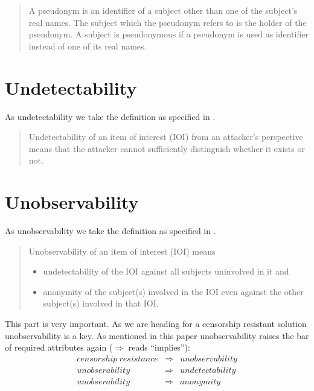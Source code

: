 \begin{quote}
	A pseudonym is an identifier of a subject other than one of the subject's real
	names. The subject which the pseudonym refers to is the holder of the pseudonym. A subject is pseudonymous if a pseudonym is used as identifier instead of one of its real names.\omitted
\end{quote}

\section{Undetectability}
As undetectability we take the definition as specified in \cite{anon_terminology}.

\begin{quote}
	Undetectability of an item of interest (IOI) from an attacker's perspective means that the
	attacker cannot sufficiently distinguish whether it exists or not.\omitted
\end{quote}

\section{Unobservability}
As unobservability we take the definition as specified in \cite{anon_terminology}.

\begin{quote}
	Unobservability of an item of interest (IOI) means
	\begin{itemize}
		\item undetectability of the IOI against all subjects uninvolved in it and
		\item anonymity of the subject(s) involved in the IOI even against the other subject(s) involved in that IOI.
	\end{itemize}
	
\end{quote}

This part is very important. As we are heading for a censorship resistant solution unobservability is a key. As mentioned in this paper unobservability raises the bar of required attributes again ($\Rightarrow$ reads ``implies''):
\begin{eqnarray*}
	censorship\ resistance & \Rightarrow & unobservability\\
	unobserability         & \Rightarrow & undetectability\\
	unobserability         & \Rightarrow & anonymity
\end{eqnarray*}

